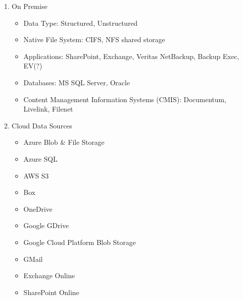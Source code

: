 \documentclass[letterpaper,10pt,english]{sphinxmanual}
\begin{document}
\begin{enumerate}
\item {} 
On Premise
\begin{itemize}
\item {} 
Data Type: Structured, Unstructured

\item {} 
Native File System: CIFS, NFS shared storage

\item {} 
Applications: SharePoint, Exchange, Veritas NetBackup, Backup Exec, EV(?)

\item {} 
Databases: MS SQL Server, Oracle

\item {} 
Content Management Information Systems (CMIS): Documentum, Livelink, Filenet

\end{itemize}

\item {} 
Cloud Data Sources
\begin{itemize}
\item {} 
Azure Blob \& File Storage

\item {} 
Azure SQL

\item {} 
AWS S3

\item {} 
Box

\item {} 
OneDrive

\item {} 
Google GDrive

\item {} 
Google Cloud Platform Blob Storage

\item {} 
GMail

\item {} 
Exchange Online

\item {} 
SharePoint Online

\end{itemize}

\end{enumerate}
\end{document}
